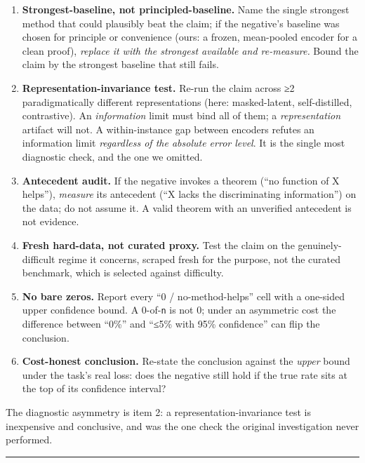 \begin{enumerate}
\def\labelenumi{\arabic{enumi}.}
\tightlist
\item
  \textbf{Strongest-baseline, not principled-baseline.} Name the single
  strongest method that could plausibly beat the claim; if the
  negative's baseline was chosen for principle or convenience (ours: a
  frozen, mean-pooled encoder for a clean proof), \emph{replace it with
  the strongest available and re-measure.} Bound the claim by the
  strongest baseline that still fails.
\item
  \textbf{Representation-invariance test.} Re-run the claim across ≥2
  paradigmatically different representations (here: masked-latent,
  self-distilled, contrastive). An \emph{information} limit must bind
  all of them; a \emph{representation} artifact will not. A
  within-instance gap between encoders refutes an information limit
  \emph{regardless of the absolute error level}. It is the single most
  diagnostic check, and the one we omitted.
\item
  \textbf{Antecedent audit.} If the negative invokes a theorem (``no
  function of X helps''), \emph{measure} its antecedent (``X lacks the
  discriminating information'') on the data; do not assume it. A valid
  theorem with an unverified antecedent is not evidence.
\item
  \textbf{Fresh hard-data, not curated proxy.} Test the claim on the
  genuinely-difficult regime it concerns, scraped fresh for the purpose,
  not the curated benchmark, which is selected against difficulty.
\item
  \textbf{No bare zeros.} Report every ``0 / no-method-helps'' cell with
  a one-sided upper confidence bound. A 0-of-\texttt{n} is not 0; under
  an asymmetric cost the difference between ``0\%'' and ``≤5\% with 95\%
  confidence'' can flip the conclusion.
\item
  \textbf{Cost-honest conclusion.} Re-state the conclusion against the
  \emph{upper} bound under the task's real loss: does the negative still
  hold if the true rate sits at the top of its confidence interval?
\end{enumerate}

The diagnostic asymmetry is item 2: a representation-invariance test is
inexpensive and conclusive, and was the one check the original
investigation never performed.

\begin{center}\rule{0.5\linewidth}{0.5pt}\end{center}

